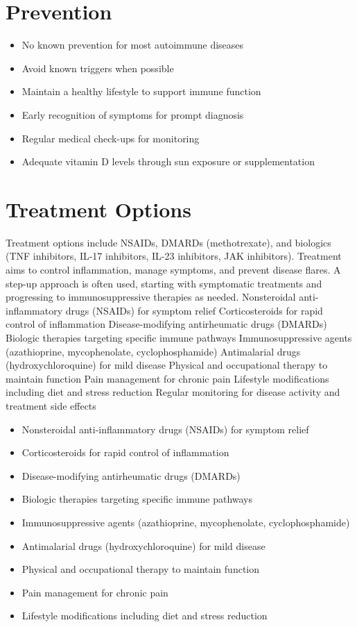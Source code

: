 \section{Prevention}
\begin{itemize}[noitemsep]
  \item No known prevention for most autoimmune diseases
  \item Avoid known triggers when possible
  \item Maintain a healthy lifestyle to support immune function
  \item Early recognition of symptoms for prompt diagnosis
  \item Regular medical check-ups for monitoring
  \item Adequate vitamin D levels through sun exposure or supplementation
\end{itemize}
\section{Treatment Options}
Treatment options include NSAIDs, DMARDs (methotrexate), and biologics (TNF inhibitors, IL-17 inhibitors, IL-23 inhibitors, JAK inhibitors). Treatment aims to control inflammation, manage symptoms, and prevent disease flares. A step-up approach is often used, starting with symptomatic treatments and progressing to immunosuppressive therapies as needed. Nonsteroidal anti-inflammatory drugs (NSAIDs) for symptom relief Corticosteroids for rapid control of inflammation Disease-modifying antirheumatic drugs (DMARDs) Biologic therapies targeting specific immune pathways Immunosuppressive agents (azathioprine, mycophenolate, cyclophosphamide) Antimalarial drugs (hydroxychloroquine) for mild disease Physical and occupational therapy to maintain function Pain management for chronic pain Lifestyle modifications including diet and stress reduction Regular monitoring for disease activity and treatment side effects

\begin{itemize}[noitemsep]
  \item Nonsteroidal anti-inflammatory drugs (NSAIDs) for symptom relief
  \item Corticosteroids for rapid control of inflammation
  \item Disease-modifying antirheumatic drugs (DMARDs)
  \item Biologic therapies targeting specific immune pathways
  \item Immunosuppressive agents (azathioprine, mycophenolate, cyclophosphamide)
  \item Antimalarial drugs (hydroxychloroquine) for mild disease
  \item Physical and occupational therapy to maintain function
  \item Pain management for chronic pain
  \item Lifestyle modifications including diet and stress reduction
\end{itemize}
